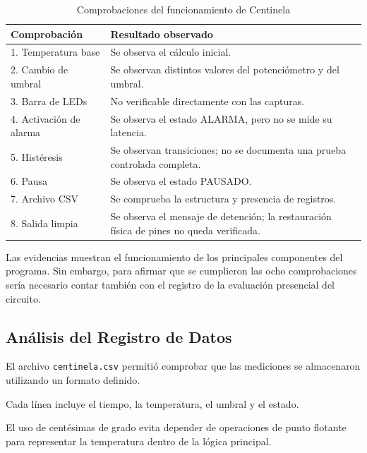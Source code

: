 \documentclass[conference]{IEEEtran}
\begin{document}
\begin{table}[H]
    \centering
    \caption{Comprobaciones del funcionamiento de Centinela}
    \label{tab:comprobaciones}
    \scriptsize
    \begin{tabular}{|p{2.9cm}|p{3.5cm}|}
        \hline
        \textbf{Comprobación} &
        \textbf{Resultado observado} \\
        \hline
        1. Temperatura base &
        Se observa el cálculo inicial. \\
        \hline
        2. Cambio de umbral &
        Se observan distintos valores del potenciómetro y del umbral. \\
        \hline
        3. Barra de LEDs &
        No verificable directamente con las capturas. \\
        \hline
        4. Activación de alarma &
        Se observa el estado ALARMA, pero no se mide su latencia. \\
        \hline
        5. Histéresis &
        Se observan transiciones; no se documenta una prueba controlada completa. \\
        \hline
        6. Pausa &
        Se observa el estado PAUSADO. \\
        \hline
        7. Archivo CSV &
        Se comprueba la estructura y presencia de registros. \\
        \hline
        8. Salida limpia &
        Se observa el mensaje de detención; la restauración física de pines no queda verificada. \\
        \hline
    \end{tabular}
\end{table}

Las evidencias muestran el funcionamiento de los principales componentes del programa. Sin embargo, para afirmar que se cumplieron las ocho comprobaciones sería necesario contar también con el registro de la evaluación presencial del circuito.

\subsection{Análisis del Registro de Datos}

El archivo \texttt{centinela.csv} permitió comprobar que las mediciones se almacenaron utilizando un formato definido.

Cada línea incluye el tiempo, la temperatura, el umbral y el estado.

El uso de centésimas de grado evita depender de operaciones de punto flotante para representar la temperatura dentro de la lógica principal.
\end{document}
